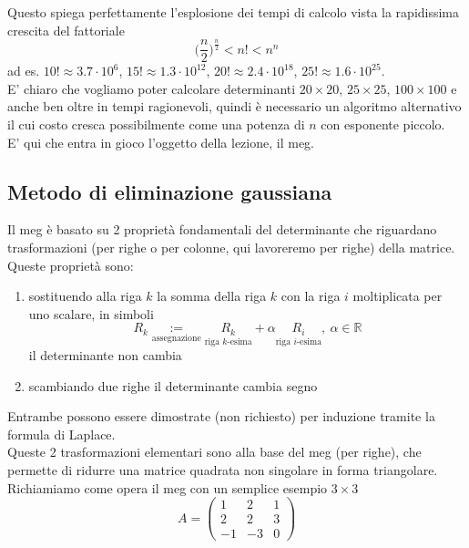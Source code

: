 Questo spiega perfettamente l'esplosione dei tempi di calcolo vista la rapidissima crescita del fattoriale
\begin{equation*}
    \bigl( \frac{n}{2} \bigr)^ {\frac{n}{2}} < n! < n^n
\end{equation*}
ad es. $10! \approx 3.7 \cdot 10^6$, $15! \approx 1.3 \cdot 10^{12}$, $20! \approx 2.4 \cdot 10^{18}$, $25! \approx 1.6 \cdot 10^{25}$.\\
E' chiaro che vogliamo poter calcolare determinanti $20 \times 20$, $25 \times 25$, $100 \times 100$ e anche ben oltre in tempi ragionevoli, quindi è necessario un algoritmo alternativo il cui costo cresca possibilmente come una potenza di $n$ con esponente piccolo. \\
E' qui che entra in gioco l'oggetto della lezione, il meg.

\subsection{Metodo di eliminazione gaussiana}
Il meg è basato su 2 proprietà fondamentali del determinante che riguardano trasformazioni (per righe o per colonne, qui lavoreremo per righe) della matrice. \\
Queste proprietà sono:
\begin{enumerate}
    \item sostituendo alla riga $k$ la somma della riga $k$ con la riga $i$ moltiplicata per uno scalare, in simboli
    \begin{equation*}
        R_k \underset{\text{assegnazione}}{:=} \underset{\text{riga $k$-esima}}{R_k} + \alpha \underset{\text{riga $i$-esima}}{R_i}, \ \alpha \in \mathbb{R}
    \end{equation*}
    il determinante non cambia
    \item scambiando due righe il determinante cambia segno
\end{enumerate}
Entrambe possono essere dimostrate (non richiesto) per induzione tramite la formula di Laplace.\\
Queste 2 trasformazioni elementari sono alla base del meg (per righe), che permette di ridurre una matrice quadrata non singolare in forma triangolare.\\
Richiamiamo come opera il meg con un semplice esempio $3 \times 3$
\begin{equation*}
    A=\begin{pmatrix}
       1 & 2 & 1 \\
       2 & 2 & 3 \\
       -1 & -3 & 0
    \end{pmatrix}
\end{equation*}
